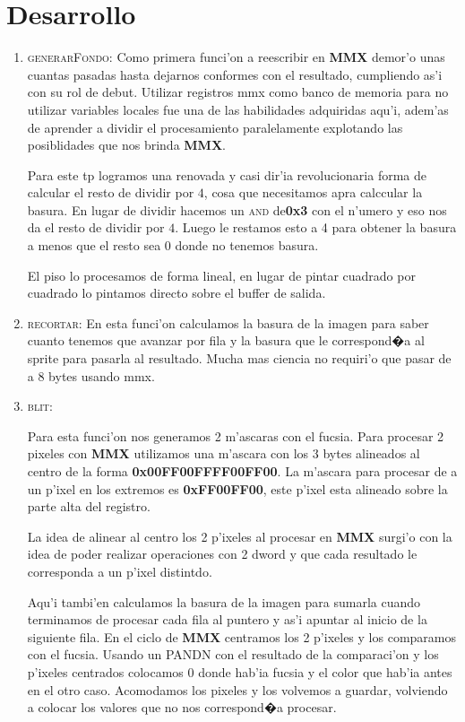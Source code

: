 \section{Desarrollo}

\begin{enumerate}
\item \textsc{generarFondo}:
Como primera funci'on a reescribir en \textbf{MMX} demor'o unas cuantas pasadas hasta
dejarnos conformes con el resultado, cumpliendo as'i con su rol de debut.
Utilizar registros mmx como banco de memoria para no utilizar variables locales
fue una de las habilidades adquiridas aqu'i, adem'as de aprender a dividir el
procesamiento paralelamente explotando las posiblidades que nos brinda
\textbf{MMX}.

Para este tp logramos una renovada y casi dir'ia revolucionaria forma de
calcular el resto de dividir por $4$, cosa que necesitamos apra calccular la
basura. En lugar de dividir hacemos un \textsc{and} de\textbf{0x3} con el
n'umero y eso nos da el resto de dividir por $4$. Luego le restamos esto a 4
para obtener la basura a menos que el resto sea 0 donde no tenemos basura.

El piso lo procesamos de forma lineal, en lugar de pintar cuadrado por cuadrado
lo pintamos directo sobre el buffer de salida.

\item \textsc{recortar}:
En esta funci'on calculamos la basura de la imagen para saber cuanto tenemos
que avanzar por fila y la basura que le correspond�a al sprite para pasarla al
resultado. Mucha mas ciencia no requiri'o que pasar de a 8 bytes usando mmx.

\item \textsc{blit}:

Para esta funci'on nos generamos 2 m'ascaras con el fucsia. Para procesar 2
pixeles con \textbf{MMX} utilizamos una m'ascara con los 3 bytes alineados al
centro de la forma \textbf{0x00FF00FFFF00FF00}. La m'ascara para procesar de a
un p'ixel en los extremos es \textbf{0xFF00FF00}, este p'ixel esta alineado
sobre la parte alta del registro.

La idea de alinear al centro los 2 p'ixeles al procesar en \textbf{MMX} surgi'o
con la idea de poder realizar operaciones con 2 dword y que cada resultado 
le corresponda a un p'ixel distintdo. 

Aqu'i tambi'en calculamos la basura de la imagen para sumarla cuando terminamos
de procesar cada fila al puntero y as'i apuntar al inicio de la siguiente fila.
En el ciclo de \textbf{MMX} centramos los 2 p'ixeles y los comparamos con el fucsia.
Usando un \textsc{PANDN} con el resultado de la comparaci'on y los p'ixeles centrados
colocamos 0 donde hab'ia fucsia y el color que hab'ia antes en el otro caso.
Acomodamos los pixeles y los volvemos a guardar, volviendo a colocar los
valores que no nos correspond�a procesar.


\end{enumerate}
